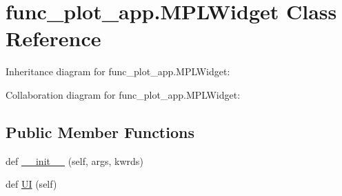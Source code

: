 \hypertarget{classfunc__plot__app_1_1MPLWidget}{}\section{func\+\_\+plot\+\_\+app.\+M\+P\+L\+Widget Class Reference}
\label{classfunc__plot__app_1_1MPLWidget}


Inheritance diagram for func\+\_\+plot\+\_\+app.\+M\+P\+L\+Widget\+:


Collaboration diagram for func\+\_\+plot\+\_\+app.\+M\+P\+L\+Widget\+:
\subsection*{Public Member Functions}
\begin{DoxyCompactItemize}
\item 
def \hyperlink{classfunc__plot__app_1_1MPLWidget_a3071d56c34fba91275079ab6bbf0ba6e}{\+\_\+\+\_\+init\+\_\+\+\_\+} (self, args, kwrds)
\item 
def \hyperlink{classfunc__plot__app_1_1MPLWidget_a463c8301c1f6e40f2f7bb76e5031af5a}{UI} (self)
\end{DoxyCompactItemize}
